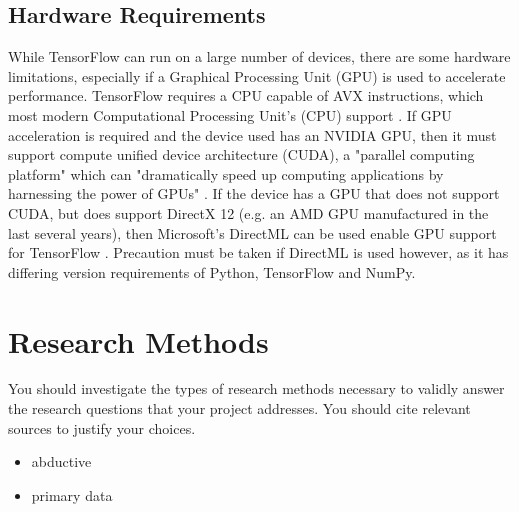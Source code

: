 \subsection{Hardware Requirements}
While TensorFlow can run on a large number of devices, there are some hardware limitations, especially if a Graphical Processing Unit (GPU) is used to accelerate performance. TensorFlow requires a CPU capable of AVX instructions, which most modern Computational Processing Unit's (CPU) support \citep{InstallT17:online}. If GPU acceleration is required and the device used has an NVIDIA GPU, then it must support compute unified device architecture (CUDA), a "parallel computing platform" which can "dramatically speed up computing applications by harnessing the power of GPUs" \citep{CUDAZone2:online}. If the device has a GPU that does not support CUDA, but does support DirectX 12 (e.g. an AMD GPU manufactured in the last several years), then Microsoft's DirectML can be used enable GPU support for TensorFlow \citep{Introduc93:online}. Precaution must be taken if DirectML is used however, as it has differing version requirements of Python, TensorFlow and NumPy.

\section{Research Methods}
You should investigate the types of research methods necessary to validly answer the research questions that your project addresses. You should cite relevant sources to justify your choices.
\begin{itemize}
    \item abductive
    \item primary data
    
\end{itemize}